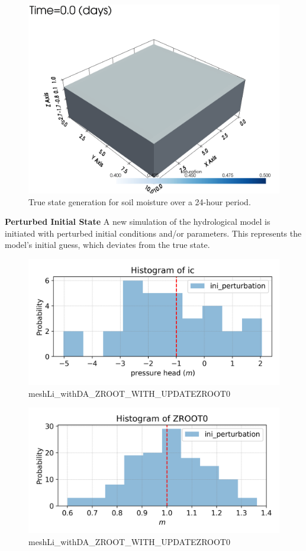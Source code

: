 \documentclass{article}
\begin{document}
\begin{figure}[!htbp]
\centering
\includegraphics[width=0.75\linewidth]{files/vtksaturation_slow-3db06418d1bd02216f096b66d7fed8a1.gif}
\caption[]{True state generation for soil moisture over a 24-hour period.}
\label{true-state-figure}
\end{figure}

\textbf{Perturbed Initial State}
A new simulation of the hydrological model is initiated with perturbed initial conditions and/or parameters. This represents the model's initial guess, which deviates from the true state.

\begin{figure}[!htbp]
\centering
\includegraphics[width=0.75\linewidth]{files/meshLi_withDA_icic-945c2a46b18c7e738c0e57931a8949e2.png}
\caption[]{meshLi\_withDA\_ZROOT\_WITH\_UPDATEZROOT0}
\label{meshLi_withDA_ZROOT_WITH_UPDATEZROOT0}
\end{figure}

\begin{figure}[!htbp]
\centering
\includegraphics[width=0.75\linewidth]{files/meshLi_withDA_ZROOT_-2d60d7a9cb7a157f54335311b88f7e2e.png}
\caption[]{meshLi\_withDA\_ZROOT\_WITH\_UPDATEZROOT0}
\label{meshLi_withDA_ZROOT_WITH_UPDATEZROOT0}
\end{figure}
\end{document}
